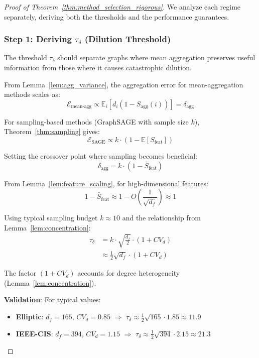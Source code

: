 \begin{proof}[Proof of Theorem~\ref{thm:method_selection_rigorous}]

We analyze each regime separately, deriving both the thresholds and the performance guarantees.

\subsubsection*{Step 1: Deriving $\tau_\delta$ (Dilution Threshold)}

The threshold $\tau_\delta$ should separate graphs where mean aggregation preserves useful information from those where it causes catastrophic dilution.

From Lemma~\ref{lem:agg_variance}, the aggregation error for mean-aggregation methods scales as:
\begin{equation}
\mathcal{E}_{\text{mean-agg}} \propto \mathbb{E}_{i}\left[d_i (1 - S_{\text{agg}}(i))\right] = \delta_{\text{agg}}
\end{equation}

For sampling-based methods (GraphSAGE with sample size $k$), Theorem~\ref{thm:sampling} gives:
\begin{equation}
\mathcal{E}_{\text{SAGE}} \propto k \cdot (1 - \mathbb{E}[S_{\text{feat}}])
\end{equation}

Setting the crossover point where sampling becomes beneficial:
\begin{equation}
\delta_{\text{agg}} = k \cdot (1 - \bar{S}_{\text{feat}})
\end{equation}

From Lemma~\ref{lem:feature_scaling}, for high-dimensional features:
\begin{equation}
1 - \bar{S}_{\text{feat}} \approx 1 - O\left(\frac{1}{\sqrt{d_f}}\right) \approx 1
\end{equation}

Using typical sampling budget $k \approx 10$ and the relationship from Lemma~\ref{lem:concentration}:
\begin{align}
\tau_\delta &= k \cdot \sqrt{\frac{d_f}{2}} \cdot (1 + CV_d) \\
&\approx \frac{1}{2}\sqrt{d_f} \cdot (1 + CV_d)
\end{align}

The factor $(1 + CV_d)$ accounts for degree heterogeneity (Lemma~\ref{lem:concentration}).

\textbf{Validation}: For typical values:
\begin{itemize}
\item \textbf{Elliptic}: $d_f = 165$, $CV_d = 0.85$ $\Rightarrow$ $\tau_\delta \approx \frac{1}{2}\sqrt{165} \cdot 1.85 \approx 11.9$
\item \textbf{IEEE-CIS}: $d_f = 394$, $CV_d = 1.15$ $\Rightarrow$ $\tau_\delta \approx \frac{1}{2}\sqrt{394} \cdot 2.15 \approx 21.3$
\end{itemize}


\end{proof}
